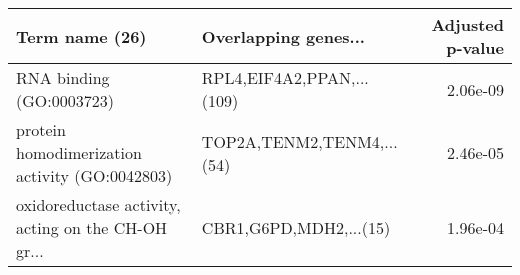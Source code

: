 \begin{tabular}{llr}
\toprule
                                    Term name (26) &      Overlapping genes... &  Adjusted p-value \\
\midrule
                          RNA binding (GO:0003723) & RPL4,EIF4A2,PPAN,...(109) &          2.06e-09 \\
    protein homodimerization activity (GO:0042803) & TOP2A,TENM2,TENM4,...(54) &          2.46e-05 \\
oxidoreductase activity, acting on the CH-OH gr... &    CBR1,G6PD,MDH2,...(15) &          1.96e-04 \\
\bottomrule
\end{tabular}

